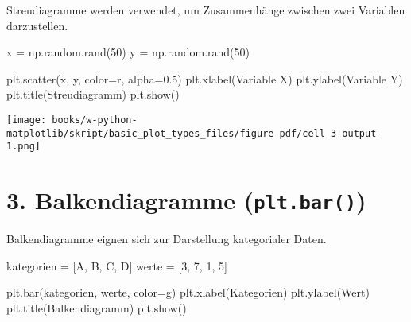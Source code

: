 \documentclass[
  letterpaper,
  DIV=11,
  numbers=noendperiod]{scrreprt}
\newenvironment{Shaded}{\begin{snugshade}}{\end{snugshade}}
\newcommand{\DecValTok}[1]{\textcolor[rgb]{0.68,0.00,0.00}{#1}}
\newcommand{\FloatTok}[1]{\textcolor[rgb]{0.68,0.00,0.00}{#1}}
\newcommand{\NormalTok}[1]{\textcolor[rgb]{0.00,0.23,0.31}{#1}}
\newcommand{\OperatorTok}[1]{\textcolor[rgb]{0.37,0.37,0.37}{#1}}
\newcommand{\StringTok}[1]{\textcolor[rgb]{0.13,0.47,0.30}{#1}}
\begin{document}
\begin{tcolorbox}
Streudiagramme werden verwendet, um Zusammenhänge zwischen zwei
Variablen darzustellen.

\begin{Shaded}
\begin{Highlighting}[]
\NormalTok{x }\OperatorTok{=}\NormalTok{ np.random.rand(}\DecValTok{50}\NormalTok{)}
\NormalTok{y }\OperatorTok{=}\NormalTok{ np.random.rand(}\DecValTok{50}\NormalTok{)}

\NormalTok{plt.scatter(x, y, color}\OperatorTok{=}\StringTok{\textquotesingle{}r\textquotesingle{}}\NormalTok{, alpha}\OperatorTok{=}\FloatTok{0.5}\NormalTok{)}
\NormalTok{plt.xlabel(}\StringTok{\textquotesingle{}Variable X\textquotesingle{}}\NormalTok{)}
\NormalTok{plt.ylabel(}\StringTok{\textquotesingle{}Variable Y\textquotesingle{}}\NormalTok{)}
\NormalTok{plt.title(}\StringTok{\textquotesingle{}Streudiagramm\textquotesingle{}}\NormalTok{)}
\NormalTok{plt.show()}
\end{Highlighting}
\end{Shaded}

\texttt{[image: books/w-python-matplotlib/skript/basic\_plot\_types\_files/figure-pdf/cell-3-output-1.png]}

\section{\texorpdfstring{3. Balkendiagramme
(\texttt{plt.bar()})}{3. Balkendiagramme (plt.bar())}}\label{balkendiagramme-plt.bar}

Balkendiagramme eignen sich zur Darstellung kategorialer Daten.

\begin{Shaded}
\begin{Highlighting}[]
\NormalTok{kategorien }\OperatorTok{=}\NormalTok{ [}\StringTok{\textquotesingle{}A\textquotesingle{}}\NormalTok{, }\StringTok{\textquotesingle{}B\textquotesingle{}}\NormalTok{, }\StringTok{\textquotesingle{}C\textquotesingle{}}\NormalTok{, }\StringTok{\textquotesingle{}D\textquotesingle{}}\NormalTok{]}
\NormalTok{werte }\OperatorTok{=}\NormalTok{ [}\DecValTok{3}\NormalTok{, }\DecValTok{7}\NormalTok{, }\DecValTok{1}\NormalTok{, }\DecValTok{5}\NormalTok{]}

\NormalTok{plt.bar(kategorien, werte, color}\OperatorTok{=}\StringTok{\textquotesingle{}g\textquotesingle{}}\NormalTok{)}
\NormalTok{plt.xlabel(}\StringTok{\textquotesingle{}Kategorien\textquotesingle{}}\NormalTok{)}
\NormalTok{plt.ylabel(}\StringTok{\textquotesingle{}Wert\textquotesingle{}}\NormalTok{)}
\NormalTok{plt.title(}\StringTok{\textquotesingle{}Balkendiagramm\textquotesingle{}}\NormalTok{)}
\NormalTok{plt.show()}
\end{Highlighting}
\end{Shaded}


\end{tcolorbox}
\end{document}
